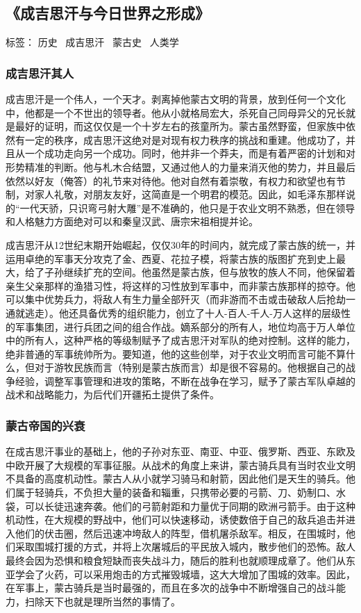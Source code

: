 \subsection{《成吉思汗与今日世界之形成》}

标签： 历史 \  成吉思汗 \  蒙古史 \  人类学


\subsubsection{成吉思汗其人}
成吉思汗是一个伟人，一个天才。剥离掉他蒙古文明的背景，放到任何一个文化中，他都是一个不世出的领导者。他从小就格局宏大，杀死自己同母异父的兄长就是最好的证明，而这仅仅是一个十岁左右的孩童所为。蒙古虽然野蛮，但家族中依然有一定的秩序，成吉思汗这绝对是对现有权力秩序的挑战和重建。他成功了，并且从一个成功走向另一个成功。同时，他并非一个莽夫，而是有着严密的计划和对形势精准的判断。他与札木合结盟，又通过他人的力量来消灭他的势力，并且最后依然以好友（俺答）的礼节来对待他。他对自然有着崇敬，有权力和欲望也有节制，对家人礼敬，对朋友友好，这简直是一个明君的模范。因此，如毛泽东那样说的“一代天骄，只识弯弓射大雕”是不准确的，他只是于农业文明不熟悉，但在领导和人格魅力方面绝对可以和秦皇汉武、唐宗宋祖相提并论。

成吉思汗从12世纪末期开始崛起，仅仅30年的时间内，就完成了蒙古族的统一，并运用卓绝的军事天分攻克了金、西夏、花拉子模，将蒙古族的版图扩充到史上最大，给了子孙继续扩充的空间。他虽然是蒙古族，但与放牧的族人不同，他保留着亲生父亲那样的渔猎习性，将这样的习性放到军事中，而非蒙古族那样的掠夺。他可以集中优势兵力，将敌人有生力量全部歼灭（而非游而不击或击破敌人后抢劫一通就逃走）。他还具备优秀的组织能力，创立了十人-百人-千人-万人这样的层级性的军事集团，进行兵团之间的组合作战。嫡系部分的所有人，地位均高于万人单位中的所有人，这种严格的等级制赋予了成吉思汗对军队的绝对控制。这样的能力，绝非普通的军事统帅所为。要知道，他的这些创举，对于农业文明而言可能不算什么，但对于游牧民族而言（特别是蒙古族而言）却是很不容易的。他根据自己的战争经验，调整军事管理和进攻的策略，不断在战争在学习，赋予了蒙古军队卓越的战术和战略能力，为后代们开疆拓土提供了条件。

\subsubsection{蒙古帝国的兴衰}
在成吉思汗事业的基础上，他的子孙对东亚、南亚、中亚、俄罗斯、西亚、东欧及中欧开展了大规模的军事征服。从战术的角度上来讲，蒙古骑兵具有当时农业文明不具备的高度机动性。蒙古人从小就学习骑马和射箭，因此他们是天生的骑兵。他们属于轻骑兵，不负担大量的装备和辎重，只携带必要的弓箭、刀、奶制口、水袋，可以长徒迅速奔袭。他们的弓箭射距和力量优于同期的欧洲弓箭手。由于这种机动性，在大规模的野战中，他们可以快速移动，诱使数倍于自己的敌兵追击并进入他们的伏击圈，然后迅速冲垮敌人的阵型，借机屠杀敌军。相反，在围城时，他们采取围城打援的方式，并将上次屠城后的平民放入城内，散步他们的恐怖。敌人最终会因为恐惧和粮食短缺而丧失战斗力，随后的胜利也就顺理成章了。他们从东亚学会了火药，可以采用炮击的方式摧毁城墙，这大大增加了围城的效率。因此，在军事上，蒙古骑兵是当时最强的，而且在多次的战争中不断增强自己的战斗能力，扫除天下也就是理所当然的事情了。

